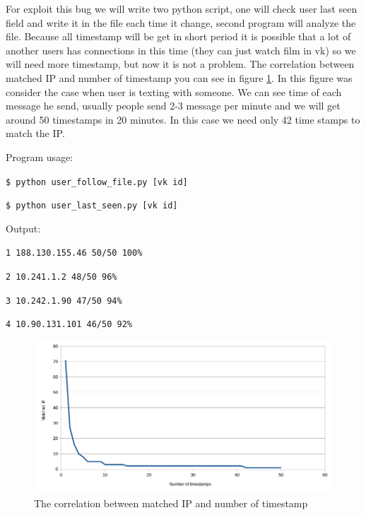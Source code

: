 For exploit this bug we will write two python script, one will check user last seen field and write it in the file each time it change, second program will analyze the file. Because all timestamp will be get in short period it is possible that a lot of another users has connections in this time (they can just watch film in vk) so we will need more timestamp, but now it is not a problem. The correlation between matched IP and number of timestamp you can see in figure \ref{fig:online}. In this figure was consider the case when user is texting with someone. We can see time of each message he send, usually people send 2-3 message per minute and we will get around 50 timestamps in 20 minutes. In this case we need only 42 time stamps to match the IP. 

Program usage:

\texttt{\$ python user{\_}follow{\_}file.py [vk id]}

\texttt{\$ python user{\_}last{\_}seen.py [vk id]}

Output:

\texttt{1 188.130.155.46 	50/50 100\%}

\texttt{2 10.241.1.2    	48/50 96\%}

\texttt{3 10.242.1.90   	47/50 94\%}

\texttt{4 10.90.131.101 	46/50 92\%}


\begin{figure} [H]
	\centering
		\includegraphics[width=180mm]{images/vk/online.png}
	\caption{The correlation between matched IP and number of timestamp}
	\label{fig:online}
\end{figure}



